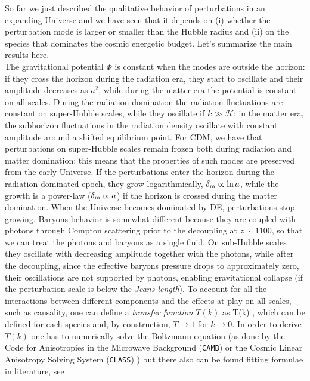 So far we just described the qualitative behavior of perturbations in an expanding Universe and we have 
seen that it depends on (i) whether the perturbation mode is larger or smaller than the Hubble radius and
(ii) on the species that dominates the cosmic energetic budget. Let's summarize the main results here. \\
The gravitational potential $\Phi$ is constant when the modes are outside the horizon: if they cross the
horizon during the radiation era, they start to oscillate and their amplitude decreases as $a^2$,
while during the matter era the potential is constant on all scales. 
During the radiation domination the radiation fluctuations are constant on super-Hubble scales, while they
oscillate if $k \gg \mathcal{H}$; in the matter era, the subhorizon fluctuations in the radiation density
 oscillate with constant amplitude around a shifted equilibrium point. For CDM, we have that perturbations on super-Hubble scales remain frozen both during radiation
and matter domination: this means that the properties of such modes are preserved from the early
Universe. If the perturbations enter the horizon during the radiation-dominated epoch, they grow 
logarithmically, $\delta_{\rm m} \propto \ln a$, while the growth is a power-law ($\delta_{\rm m} \propto a$)
if the horizon is crossed during the matter domination. When the Universe becomes dominated by \gls{DE},
perturbations stop growing.
Baryons behavior is somewhat different because they are coupled with photons through Compton
scattering prior to the decoupling at $z\sim 1100$, so that we can treat the photons and baryons as a 
single fluid. On sub-Hubble scales they oscillate with decreasing amplitude together with the photons,
while after the decoupling, since the effective baryons pressure drops to approximately zero, their 
oscillations are not supported by photons, enabling gravitational collapse (if the perturbation scale is 
below the \emph{Jeans length}).
To account for all the interactions between different components and the effects at play on all scales, such
as causality, one can define a \emph{transfer function} $T(k)$ as \citep{Eisenstein1998}
%
\be
\label{eq:trans_func}
T(k) \equiv {},
\ee
%
which can be defined for each species and, by construction, $T \to 1$ for $k \to 0$. In order to derive 
$T(k)$ one has to numerically solve the Boltzmann equation (as done by the Code for Anisotropies in the Microwave Background (\texttt{CAMB}) \citep{Lewis2000a} or the Cosmic Linear Anisotropy Solving System (\texttt{CLASS}) \citep{Lesgourgues2011}) but there also can be found fitting formulae in literature, see 
